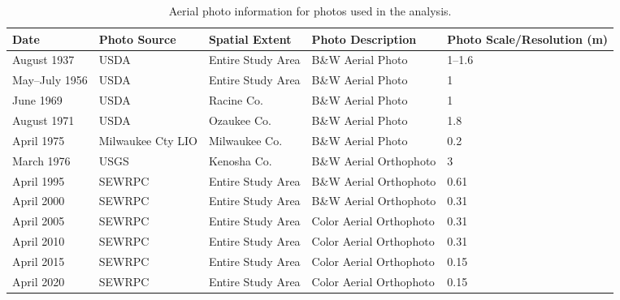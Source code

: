 \begin{table}[ht]
  \caption{Aerial photo information for photos used in the analysis.}
  \centering
  \footnotesize
  \setlength{\tabcolsep}{4pt} %
  \renewcommand{\arraystretch}{1.2} %
  \begin{tabularx}{\textwidth}{l l l X p{2cm}}
    \toprule
    \textbf{Date} & \textbf{Photo Source} & \textbf{Spatial Extent} & \textbf{Photo Description} & \textbf{Photo Scale/Resolution (m)} \\
    \midrule
    August 1937   & USDA            & Entire Study Area & B\&W Aerial Photo       & 1--1.6 \\
    May--July 1956 & USDA           & Entire Study Area & B\&W Aerial Photo       & 1 \\
    June 1969     & USDA            & Racine Co.        & B\&W Aerial Photo       & 1 \\
    August 1971   & USDA            & Ozaukee Co.       & B\&W Aerial Photo       & 1.8 \\
    April 1975    & Milwaukee Cty LIO & Milwaukee Co.   & B\&W Aerial Photo       & 0.2 \\
    March 1976    & USGS            & Kenosha Co.       & B\&W Aerial Orthophoto  & 3 \\
    April 1995    & SEWRPC          & Entire Study Area & B\&W Aerial Orthophoto  & 0.61 \\
    April 2000    & SEWRPC          & Entire Study Area & B\&W Aerial Orthophoto  & 0.31 \\
    April 2005    & SEWRPC          & Entire Study Area & Color Aerial Orthophoto & 0.31 \\
    April 2010    & SEWRPC          & Entire Study Area & Color Aerial Orthophoto & 0.31 \\
    April 2015    & SEWRPC          & Entire Study Area & Color Aerial Orthophoto & 0.15 \\
    April 2020    & SEWRPC          & Entire Study Area & Color Aerial Orthophoto & 0.15 \\
    \bottomrule
  \end{tabularx}
  \label{tab:tab2.2}
\end{table}
